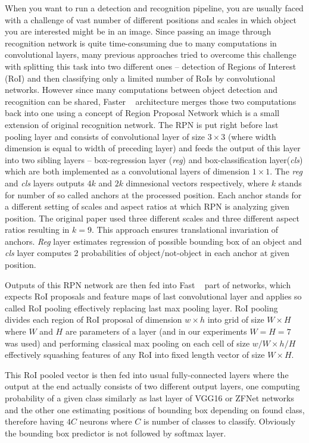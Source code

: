 When you want to run a detection and recognition pipeline, you are usually faced with a challenge of vast number of different positions and scales in which object you are interested might be in an image. Since passing an image through recognition network is quite time-consuming due to many computations in convolutional layers, many previous approaches tried to overcome this challenge with splitting this task into two different ones -- detection of Regions of Interest (RoI) and then classifying only a limited number of RoIs by convolutional networks. However since many computations between object detection and recognition can be shared, Faster \rcnn{}~\cite{faster} architecture merges those two computations back into one using a concept of Region Proposal Network which is a small extension of original recognition network. The RPN is put right before last pooling layer and consists of convolutional layer of size $3\times3$ (where width dimension is equal to width of preceding layer) and feeds the output of this layer into two sibling layers -- box-regression layer (\emph{reg}) and box-classification layer(\emph{cls}) which are both implemented as a convolutional layers of dimension $1\times1$. The \emph{reg} and \emph{cls} layers outputs $4k$ and $2k$ dimnesional vectors respectively, where $k$ stands for number of so called anchors at the processed position. Each anchor stands for a different setting of scales and aspect ratios at which RPN is analyzing given position. The original paper used three different scales and three different aspect ratios resulting in $k=9$. This approach ensures translational invariation of anchors. \emph{Reg} layer estimates regression of possible bounding box of an object and \emph{cls} layer computes 2 probabilities of object/not-object in each anchor at given position.

Outputs of this RPN network are then fed into Fast \rcnn{}~\cite{fast} part of networks, which expects RoI proposals and feature maps of last convolutional layer and applies so called RoI pooling effectively replacing last max pooling layer. RoI pooling divides each region of RoI proposal of dimension $w\times h$ into grid of size $W\times H$ where $W$ and $H$ are parameters of a layer (and in our experiments $W = H = 7$ was used) and performing classical max pooling on each cell of size $w/W\times h/H$ effectively squashing features of any RoI into fixed length vector of size $W\times H$.

This RoI pooled vector is then fed into usual fully-connected layers where the output at the end actually consists of two different output layers, one computing probability of a given class similarly as last layer of VGG16 or ZFNet networks and the other one estimating positions of bounding box depending on found class, therefore having $4C$ neurons where $C$ is number of classes to classify. Obviously the bounding box predictor is not followed by softmax layer.

